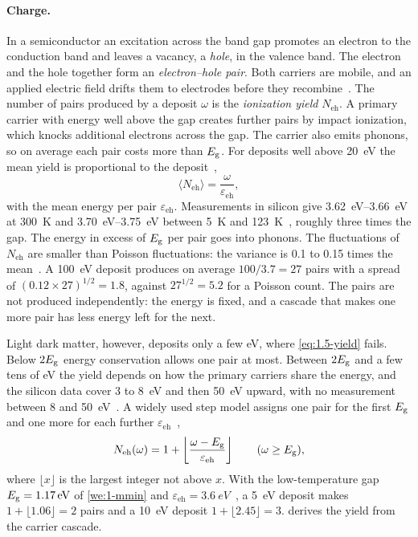 \paragraph{Charge.} In a semiconductor an excitation across the band gap promotes an electron to the conduction band and leaves a vacancy, a \emph{hole}, in the valence band. The electron and the hole together form an \emph{electron--hole pair}. Both carriers are mobile, and an applied electric field drifts them to electrodes before they recombine~\cite[Sect.~VII\,A]{kahn2022searches}. The number of pairs produced by a deposit $\omega$ is the \emph{ionization yield} $N_{\mathrm{eh}}$. A primary carrier with energy well above the gap creates further pairs by impact ionization, which knocks additional electrons across the gap. The carrier also emits phonons, so on average each pair costs more than $E_{\mathrm{g}}$. For deposits well above \SI{20}{eV} the mean yield is proportional to the deposit~\cite[abstract and Eq.~(1)]{ramanathan2020ionization},
\begin{equation}
  \langle N_{\mathrm{eh}}\rangle = \frac{\omega}{\varepsilon_{\mathrm{eh}}} ,
  \label{eq:1.5-yield}
\end{equation}
with the mean energy per pair $\varepsilon_{\mathrm{eh}}$. Measurements in silicon give \SIrange{3.62}{3.66}{eV} at \SI{300}{K} and \SIrange{3.70}{3.75}{eV} between \SI{5}{K} and \SI{123}{K}~\cite[Table~I]{ramanathan2020ionization}, roughly three times the gap. The energy in excess of $E_{\mathrm{g}}$ per pair goes into phonons. The fluctuations of $N_{\mathrm{eh}}$ are smaller than Poisson fluctuations: the variance is 0.1 to 0.15 times the mean~\cite[Eq.~(5.4)]{essig2016direct}. A \SI{100}{eV} deposit produces on average $100/3.7 = 27$ pairs with a spread of $(0.12 \times 27)^{1/2} = 1.8$, against $27^{1/2} = 5.2$ for a Poisson count. The pairs are not produced independently: the energy is fixed, and a cascade that makes one more pair has less energy left for the next.

Light dark matter, however, deposits only a few eV, where \cref{eq:1.5-yield} fails. Below $2E_{\mathrm{g}}$ energy conservation allows one pair at most. Between $2E_{\mathrm{g}}$ and a few tens of eV the yield depends on how the primary carriers share the energy, and the silicon data cover 3 to \SI{8}{eV} and then \SI{50}{eV} upward, with no measurement between 8 and \SI{50}{eV}~\cite[Sect.~III]{ramanathan2020ionization}. A widely used step model assigns one pair for the first $E_{\mathrm{g}}$ and one more for each further $\varepsilon_{\mathrm{eh}}$~\cite[Eq.~(5.1)]{essig2016direct},
\begin{equation}
  N_{\mathrm{eh}}(\omega) = 1 + \left\lfloor \frac{\omega - E_{\mathrm{g}}}{\varepsilon_{\mathrm{eh}}} \right\rfloor \qquad (\omega \ge E_{\mathrm{g}}),
  \label{eq:1.5-step}
\end{equation}
where $\lfloor x\rfloor$ is the largest integer not above $x$. With the low-temperature gap $E_{\mathrm{g}} = \SI{1.17}{eV}$ of \cref{we:1-mmin} and $\varepsilon_{\mathrm{eh}} = \SI{3.6}{eV}$~\cite[Eq.~(5.2)]{essig2016direct}, a \SI{5}{eV} deposit makes $1 + \lfloor 1.06\rfloor = 2$ pairs and a \SI{10}{eV} deposit $1 + \lfloor 2.45\rfloor = 3$.  derives the yield from the carrier cascade.

